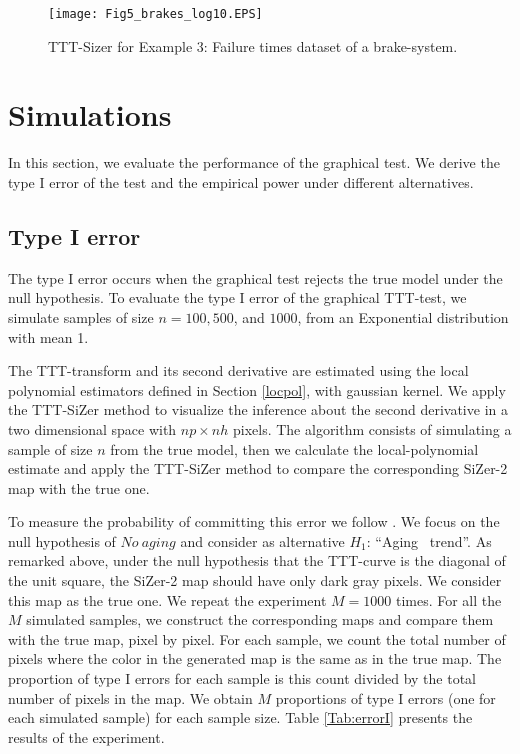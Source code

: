\documentclass[preprint,12pt]{elsarticle}
\begin{document}
\begin{figure}[htb]
\begin{center}
\texttt{[image: Fig5\_brakes\_log10.EPS]}
\caption{TTT-Sizer for Example 3: Failure times dataset of a brake-system.}\label{Fig:brakes}
\end{center}
\end{figure}
%

\bigskip
\section{Simulations}\label{sec:sim}
In this section, we evaluate the performance of the graphical test. We derive the type I error of the test and the empirical power under different alternatives.%

\subsection{Type I error}
The type I error occurs when the graphical test rejects the true model under the null hypothesis. To evaluate the type I error of the graphical TTT-test, we simulate samples of size $n = 100, 500$, and $1000$, from an Exponential distribution with mean 1.

The TTT-transform and its second derivative are estimated using the local polynomial estimators defined in Section \ref{locpol}, with gaussian kernel. We apply the  TTT-SiZer method to visualize the inference about the second derivative in a two dimensional space with $np \times nh$ pixels.  
The algorithm consists of simulating a sample of size $n$ from the true model, then we calculate the local-polynomial estimate and apply the TTT-SiZer method to compare the corresponding SiZer-2 map with the true one.

To measure the probability of committing this error we follow \cite{RMP07}. We focus on the null hypothesis of $No \ aging$ and consider as alternative $H_1$: ``Aging \ trend''.
As remarked above, under the null hypothesis that the TTT-curve is the diagonal of the unit square, the SiZer-2 map  should have only dark gray pixels. We consider this map as the true one. We repeat the experiment $M=1000$ times.  For all the $M$ simulated samples, we construct the corresponding maps and compare them with the true map, pixel by pixel. For each sample, we count the total number of pixels where the color in the generated map is the same as in the true map. The proportion of type I errors for each sample is this count divided by the total number of pixels in the map. We obtain $M$ proportions of type I errors (one for each simulated sample) for each sample size. Table \ref{Tab:errorI} presents the results of the experiment. 
\end{document}
